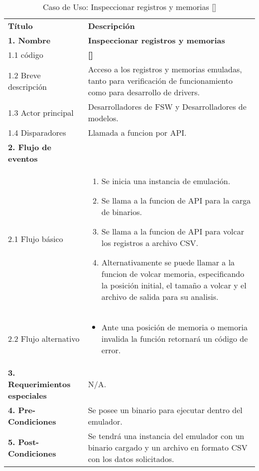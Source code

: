 \documentclass[
  11pt, %
  codirector, %
]{charter}
\makeatletter
\newcommand{\mytwodigits}[1]{\two@digits{#1}}
\newcounter{reqCounter}
\makeatother
\begin{document}


\begin{table}[h!]
	\caption{Caso de Uso: Inspeccionar registros y memorias [\CODrequerimiento\mytwodigits{\value{reqCounter}}]}
	\centering
	\begin{tabular}{ | m{4.0cm} | m{10cm} | }
		\hline
		\rowcolor{gray!50} %
		\textbf{Título} & \textbf{Descripción} \\ %
		\textbf{1. Nombre} & \textbf{Inspeccionar registros y memorias} \\
		1.1 código &\textbf{[\CODrequerimiento\mytwodigits{\value{reqCounter}}]} \\
		1.2 Breve descripción & Acceso a los registros y memorias emuladas, tanto para verificación de funcionamiento como para desarrollo de drivers. \\
		1.3 Actor principal & Desarrolladores de FSW y Desarrolladores de modelos. \\
		1.4 Disparadores & Llamada a funcion por API. \\ \hline
		\textbf{2. Flujo de eventos} &  \\
		2.1 Flujo básico &
		\begin{enumerate}
			\item Se inicia una instancia de emulación.
      \item Se llama a la funcion de API para la carga de binarios.
      \item Se llama a la funcion de API para volcar los registros a archivo CSV.
      \item Alternativamente se puede llamar a la funcion de volcar memoria, especificando la posición initial, el tamaño a volcar y el archivo de salida para su analisis.
		\end{enumerate} \\
		2.2 Flujo alternativo &
		\begin{itemize}
			\item Ante una posición de memoria o memoria invalida la función retornará un código de error.
		\end{itemize} \\ \hline
		\textbf{3. Requerimientos especiales} & N/A. \\ \hline
		\textbf{4. Pre-Condiciones} & Se posee un binario para ejecutar dentro del emulador. \\ \hline
		\textbf{5. Post-Condiciones} & Se tendrá una instancia del emulador con un binario cargado y un archivo en formato CSV con los datos solicitados. \\ \hline
	\end{tabular}

\end{table}
\end{document}
